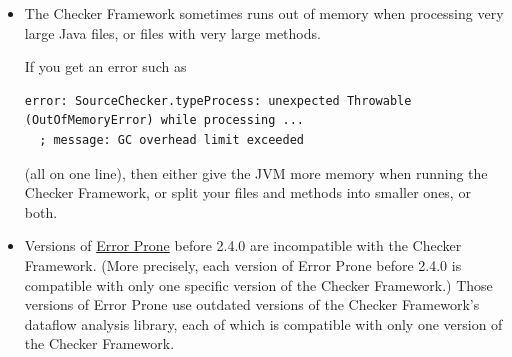 \begin{itemize}
Here are more details about the error.

Starting with JDK 22, when \<javac> reads a class file, it attaches the
type annotations in the class file to the types in the signatures of the
class's methods and fields (see
\href{https://bugs.openjdk.org/browse/JDK-8225377}{JDK-8225377}).  Doing so
requires the class files for those types, even if your code never uses the
method or field.  If a class file is missing, \<javac> issues this error.
JDK 17 and JDK 21 also
require the
class files, if you pass \<-XDaddTypeAnnotationsToSymbol=true>.

This error is not specific to the Checker Framework:  \<javac> issues it
whenever a library contains type annotations, such as ones written
explicitly in the library's source code.  However, the error is more
common when a library is compiled with the Checker Framework, because the
Checker Framework writes an annotation on every type in the library's
signatures (see Section~\ref{faq-classfile-annotations}).  This is the case
even if the library's source code contains no annotations.

If you use Maven with , then Maven might hide this error
message and report only ``Compilation failure''
(see \href{https://issues.apache.org/jira/browse/MCOMPILER-434}{MCOMPILER-434}).

\item
The Checker Framework sometimes runs out of memory when processing very
large Java files, or files with very large methods.

If you get an error such as
\begin{Verbatim}
error: SourceChecker.typeProcess: unexpected Throwable (OutOfMemoryError) while processing ...
  ; message: GC overhead limit exceeded
\end{Verbatim}

\noindent
(all on one line),
then either give the JVM more memory when running the Checker Framework, or
split your files and methods into smaller ones, or both.

\item
Versions of \href{https://errorprone.info/}{Error Prone} before 2.4.0 are
incompatible with the Checker Framework.  (More precisely, each version of
Error Prone before 2.4.0 is compatible with only one specific version of
the Checker Framework.)  Those versions of Error Prone
use outdated versions of the Checker Framework's dataflow analysis
library, each of which is compatible with only one version of the Checker Framework.


\end{itemize}
